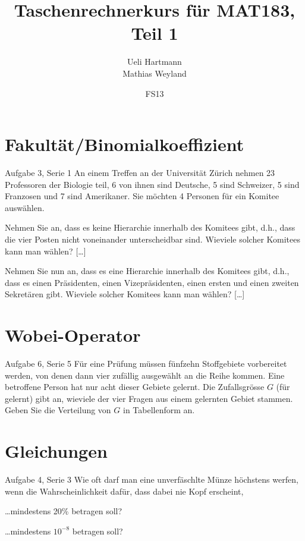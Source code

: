\documentclass{beamer}
\title{Taschenrechnerkurs für MAT183, Teil 1}
\author{Ueli Hartmann\\Mathias Weyland}
\date{FS13}
\begin{document}
\frame{\maketitle}


\section{Fakultät/Binomialkoeffizient}

\begin{frame}{Aufgabe 3, Serie 1}
An einem Treffen an der Universität Zürich nehmen 23 Professoren der Biologie teil, 6 von
ihnen sind Deutsche, 5 sind Schweizer, 5 sind Franzosen und 7 sind Amerikaner.
Sie möchten 4 Personen für ein Komitee auswählen.

\begin{outline}
\item Nehmen Sie an, dass es keine Hierarchie innerhalb des Komitees gibt, d.h., dass die
vier Posten nicht voneinander unterscheidbar sind. Wieviele solcher Komitees kann
man wählen? [\ldots]\pause
\item Nehmen Sie nun an, dass es eine Hierarchie innerhalb des Komitees gibt, d.h., dass es
einen Präsidenten, einen Vizepräsidenten, einen ersten und einen zweiten
Sekretären gibt. Wieviele solcher Komitees kann man wählen? [\ldots]
\end{outline}
\end{frame}

\section{Wobei-Operator}
\begin{frame}{Aufgabe 6, Serie 5}
Für eine Prüfung müssen fünfzehn Stoffgebiete vorbereitet werden, von denen dann
vier zufällig ausgewählt an die Reihe kommen. Eine betroffene Person hat nur
acht dieser Gebiete gelernt. Die Zufallsgrösse $G$ (für gelernt) gibt an,
wieviele der vier Fragen aus einem gelernten Gebiet stammen. Geben Sie die
Verteilung von $G$ in Tabellenform an.
\end{frame}

\section{Gleichungen}
\begin{frame}{Aufgabe 4, Serie 3}
Wie oft darf man eine unverfäschlte Münze höchstens werfen, wenn die Wahrscheinlichkeit
dafür, dass dabei nie Kopf erscheint,
\begin{outline}
\item \dots mindestens 20\% betragen soll?
\item \dots mindestens $10^{-8}$ betragen soll?
\end{outline}
\end{frame}
\end{document}
